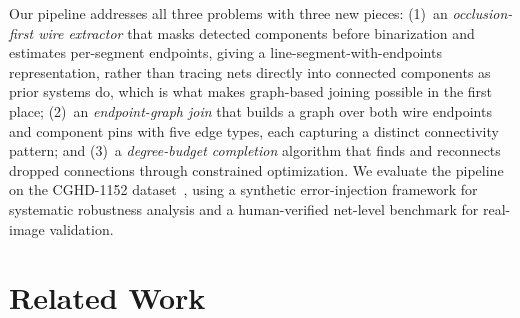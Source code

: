 \documentclass{ieeeaccess}
\begin{document}
Our pipeline addresses all three problems with three new pieces: (1)~an \emph{occlusion-first wire extractor} that masks detected components before binarization and estimates per-segment endpoints, giving a line-segment-with-endpoints representation, rather than tracing nets directly into connected components as prior systems do, which is what makes graph-based joining possible in the first place; (2)~an \emph{endpoint-graph join} that builds a graph over both wire endpoints and component pins with five edge types, each capturing a distinct connectivity pattern; and (3)~a \emph{degree-budget completion} algorithm that finds and reconnects dropped connections through constrained optimization. We evaluate the pipeline on the CGHD-1152 dataset~\cite{bayer2021cghd}, using a synthetic error-injection framework for systematic robustness analysis and a human-verified net-level benchmark for real-image validation.

\section{Related Work}
\end{document}
